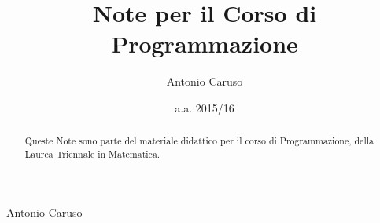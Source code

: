 \documentclass[a4paper]{amsbook}
\makeatletter
\theoremstyle{definition}
\renewcommand\maketitle{
\begin{titlepage} \vspace*{\stretch{1}}
\begin{center} {\Huge \@title \par}%
	 \vspace{5em}%
	 {\LARGE Antonio Caruso \par}%
	 \vspace{1.5em} {
	 \large \emph{\@date} \par}%
	 \vspace{3em} \end{center}%
\vspace*{\stretch{1}}
\end{titlepage}}
\makeatother
\begin{document}
\frontmatter 
\title{Note per il Corso di Programmazione}
\author{Antonio Caruso} 
\address{\centering
 Dipartimento di Matematica e Fisica 'Ennio De Giorgi'\newline
 \centering Complesso Ecotekne, Palazzo Fiorini
}
\date{a.a. 2015/16}
\begin{abstract}
	Queste Note sono parte del materiale didattico per il corso di Programmazione, della Laurea Triennale in Matematica.
\end{abstract}
\maketitle
{}
\tableofcontents
\mainmatter

\pagestyle{headings}



\end{document}
